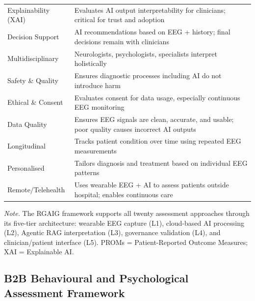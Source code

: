 {\begin{xltabular}{\textwidth}{@{} >{\raggedright\arraybackslash}p{3.2cm} L @{}}
Explainability (XAI) & Evaluates AI output interpretability for clinicians; critical for trust and adoption \\
\addlinespace
Decision Support & AI recommendations based on EEG + history; final decisions remain with clinicians \\
\addlinespace
Multidisciplinary & Neurologists, psychologists, specialists interpret holistically \\
\addlinespace
Safety \& Quality & Ensures diagnostic processes including AI do not introduce harm \\
\addlinespace
Ethical \& Consent & Evaluates consent for data usage, especially continuous EEG monitoring \\
\addlinespace
Data Quality & Ensures EEG signals are clean, accurate, and usable; poor quality causes incorrect AI outputs \\
\addlinespace
Longitudinal & Tracks patient condition over time using repeated EEG measurements \\
\addlinespace
Personalised & Tailors diagnosis and treatment based on individual EEG patterns \\
\addlinespace
Remote/Telehealth & Uses wearable EEG + AI to assess patients outside hospital; enables continuous care \\
\end{xltabular}}
\vspace{0.5em}
\noindent\textit{Note.} The RGAIG framework supports all twenty assessment approaches through its five-tier architecture: wearable EEG capture (L1), cloud-based AI processing (L2), Agentic RAG interpretation (L3), governance validation (L4), and clinician/patient interface (L5). PROMs = Patient-Reported Outcome Measures; XAI = Explainable AI.
\fi %

\label{sec:patient_assessment}
\label{tab:patient_assessment}


\iffalse %
\subsection{B2B Behavioural and Psychological Assessment Framework}
\label{sec:b2b_psychological}


